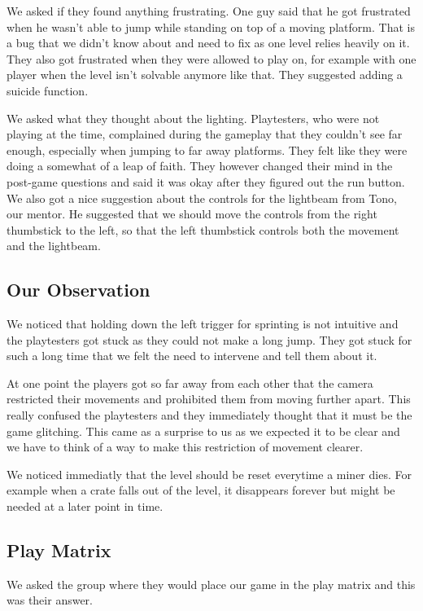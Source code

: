 We asked if they found anything frustrating. One guy said that he got frustrated when he wasn't able to jump while standing on top of a moving platform. That is a bug that we didn't know about and need to fix as one level relies heavily on it. They also got frustrated when they were allowed to play on, for example with one player when the level isn't solvable anymore like that. They suggested adding a suicide function.

We asked what they thought about the lighting. Playtesters, who were not playing at the time, complained during the gameplay that they couldn't see far enough, especially when jumping to far away platforms. They felt like they were doing a somewhat of a leap of faith. They however changed their mind in the post-game questions and said it was okay after they figured out the run button. We also got a nice suggestion about the controls for the lightbeam from Tono, our mentor. He suggested that we should move the controls from the right thumbstick to the left, so that the left thumbstick controls both the movement and the lightbeam.

\subsection{Our Observation}

We noticed that holding down the left trigger for sprinting is not intuitive and the playtesters got stuck as they could not make a long jump. They got stuck for such a long time that we felt the need to intervene and tell them about it.

At one point the players got so far away from each other that the camera restricted their movements and prohibited them from moving further apart. This really confused the playtesters and they immediately thought that it must be the game glitching. This came as a surprise to us as we expected it to be clear and we have to think of a way to make this restriction of movement clearer.

We noticed immediatly that the level should be reset everytime a miner dies. For example when a crate falls out of the level, it disappears forever but might be needed at a later point in time.

\subsection{Play Matrix}
We asked the group where they would place our game in the play matrix and this was their answer.

